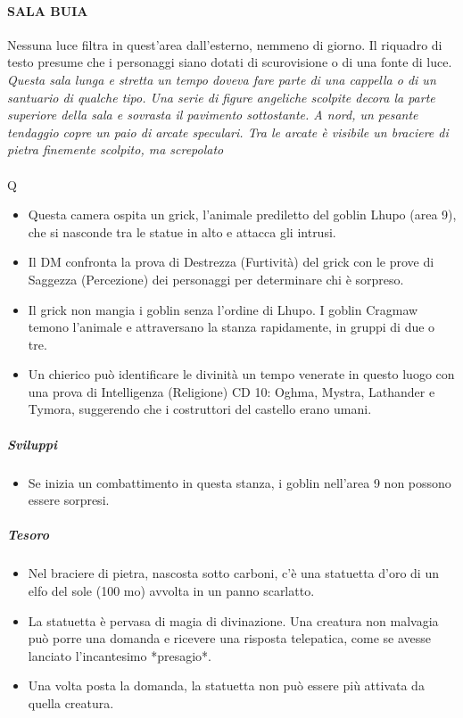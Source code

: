 \documentclass{article}
\begin{document}
\paragraph{SALA BUIA}
Nessuna luce filtra in quest'area dall’esterno, nemmeno di
giorno. Il riquadro di testo presume che i personaggi siano
dotati di scurovisione o di una fonte di luce.\\
\textit{Questa sala lunga e stretta un tempo doveva fare parte di
una cappella o di un santuario di qualche tipo. Una serie
di figure angeliche scolpite decora la parte superiore della
sala e sovrasta il pavimento sottostante. A nord, un pesante
tendaggio copre un paio di arcate speculari. Tra le arcate è
visibile un braciere di pietra finemente scolpito, ma screpolato}\\
\\
Q\begin{itemize}
    \item Questa camera ospita un grick, l'animale prediletto del goblin Lhupo (area 9), che si nasconde tra le statue in alto e attacca gli intrusi.
    \item Il DM confronta la prova di Destrezza (Furtività) del grick con le prove di Saggezza (Percezione) dei personaggi per determinare chi è sorpreso.
    \item Il grick non mangia i goblin senza l'ordine di Lhupo. I goblin Cragmaw temono l'animale e attraversano la stanza rapidamente, in gruppi di due o tre.
    \item Un chierico può identificare le divinità un tempo venerate in questo luogo con una prova di Intelligenza (Religione) CD 10: Oghma, Mystra, Lathander e Tymora, suggerendo che i costruttori del castello erano umani.
\end{itemize}

\subparagraph{Sviluppi} 
\begin{itemize}
    \item Se inizia un combattimento in questa stanza, i goblin nell'area 9 non possono essere sorpresi.
\end{itemize}

\subparagraph{Tesoro} 
\begin{itemize}
    \item Nel braciere di pietra, nascosta sotto carboni, c'è una statuetta d'oro di un elfo del sole (100 mo) avvolta in un panno scarlatto.
    \item La statuetta è pervasa di magia di divinazione. Una creatura non malvagia può porre una domanda e ricevere una risposta telepatica, come se avesse lanciato l'incantesimo *presagio*.
    \item Una volta posta la domanda, la statuetta non può essere più attivata da quella creatura.
\end{itemize}
\end{document}

